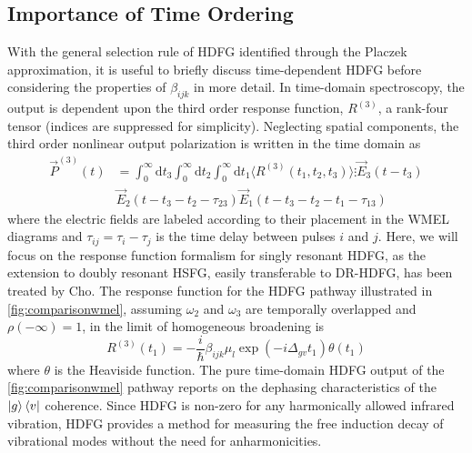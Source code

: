 \documentclass[aip, jcp, reprint, onecolumn]{revtex4-2}
\begin{document}
\subsection{Importance of Time Ordering}
With the general selection rule of HDFG identified through the Placzek approximation, it is useful to briefly discuss time-dependent HDFG before considering the properties of $\beta_{ijk}$ in more detail. 
In time-domain spectroscopy, the output is dependent upon the third order response function, $R^{(3)}$, a rank-four tensor (indices are suppressed for simplicity).
Neglecting spatial components, the third order nonlinear output polarization is written in the time domain as \cite{RN287}
\begin{equation}
	\begin{split}
		\vec{P}^{(3)}(t) &= \int_0^\infty \mathrm{d}t_3 \int_0^\infty \mathrm{d}t_2 \int_0^\infty \mathrm{d}t_1 \langle R^{(3)}(t_1, t_2, t_3) \rangle  \vdots \vec{E}_3(t-t_3) \\
		&\vec{E}_2(t-t_3-t_2 - \tau_{23}) \vec{E}_1(t-t_3-t_2-t_1 - \tau_{13}) 
	\end{split}
\end{equation}
where the electric fields are labeled according to their placement in the WMEL diagrams and $\tau_{ij} = \tau_i - \tau_j$ is the time delay between pulses $i$ and $j$.
Here, we will focus on the response function formalism for singly resonant HDFG, as the extension to doubly resonant HSFG, easily transferable to DR-HDFG, has been treated by Cho. \cite{Cho2001}
The response function for the HDFG pathway illustrated in \autoref{fig:comparisonwmel}, assuming $\omega_2$ and $\omega_3$ are temporally overlapped and $\rho(-\infty) = 1$, in the limit of homogeneous broadening is
\begin{equation}
	R^{(3)}(t_1) = -\frac{i}{\hbar} \beta_{ijk} \mu_l \exp(-i\Delta_{gv}t_1) \theta(t_1) 
\end{equation}  
where $\theta$ is the Heaviside function. \cite{Cho2001, RN135, Meyer2004, RN367}
The pure time-domain HDFG output of the \autoref{fig:comparisonwmel} pathway reports on the dephasing characteristics of the $\ket{g}\bra{v}$ coherence. 
Since HDFG is non-zero for any harmonically allowed infrared vibration, HDFG provides a method for measuring the free induction decay of vibrational modes without the need for anharmonicities.
\end{document}
